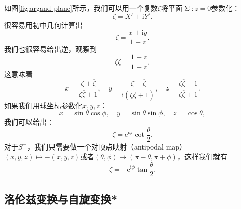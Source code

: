 如图\ref{fig:argand-plane}所示，我们可以用一个复数$\zeta $将平面$\upSigma :z=0$参数化：
\begin{equation*}
	\zeta =X'+\mathrm{i} Y'.
\end{equation*}
很容易用初中几何计算出
\begin{equation*}
	\zeta =\frac{x+\mathrm{i} y}{1-z} .
\end{equation*}
我们也很容易给出逆，观察到
\begin{equation*}
	\zeta \overline{\zeta } =\frac{1+z}{1-z} ,
\end{equation*}
这意味着
\begin{equation}
	x=\frac{\zeta +\overline{\zeta }}{\zeta \overline{\zeta } +1} ,\quad y=\frac{\zeta -\overline{\zeta }}{\mathrm{i} (\zeta \overline{\zeta } +1)} ,\quad z=\frac{\zeta \overline{\zeta } -1}{\zeta \overline{\zeta } +1} .
	\label{eq:coordinate of stereographic projection}
\end{equation}
如果我们用球坐标参数化$x,y,z$：
\begin{equation*}
	x=\sin \theta \cos \phi ,\quad y=\sin \theta \sin \phi ,\quad z=\cos \theta ,
\end{equation*}
我们可以给出：
\begin{equation*}
	\zeta =\mathrm{e}^{\mathrm{i} \phi }\cot\frac{\theta }{2} .
\end{equation*}
对于$S^{-}$，我们只需要做一个对顶点映射（antipodal map）$( x,y,z) \mapsto -(x,y,z )$或者$( \theta ,\phi ) \mapsto ( \pi -\theta ,\pi +\phi )$，这样我们就有
\begin{equation*}
	\zeta =-\mathrm{e}^{\mathrm{i} \phi }\tan\frac{\theta }{2} .
\end{equation*}

\subsection{洛伦兹变换与自旋变换*}

